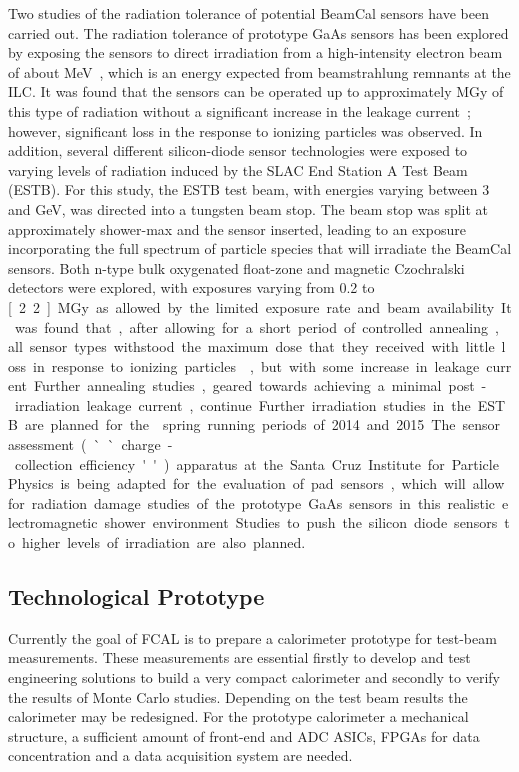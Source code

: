 Two studies of the radiation tolerance of potential BeamCal sensors have been carried out. The
radiation tolerance of prototype GaAs sensors has been explored by exposing the sensors
to direct irradiation from a high-intensity electron beam of about \unit[10]{MeV}~\cite{sdalinac},
which is an energy expected from beamstrahlung
remnants at the ILC.
It was found that the sensors can be operated up
to approximately \unit[1]{MGy} of this type of radiation without a significant increase in the
leakage current~\cite{1748-0221-7-11-P11022}; however, significant loss in the response to ionizing particles was observed.
In addition, several different silicon-diode sensor technologies were exposed to varying levels
of radiation induced by the SLAC End Station A Test Beam (ESTB).
For this study, the ESTB test beam, with energies
varying between 3 and \unit[11]{GeV}, was directed into a tungsten beam stop.
The beam stop was split at approximately shower-max and the sensor inserted,
leading to an exposure incorporating the full spectrum of particle species that will
irradiate the BeamCal sensors. Both n-type bulk oxygenated float-zone and magnetic Czochralski
detectors were explored, with exposures varying from 0.2 to \unit[2.2]{MGy} as allowed by
the limited exposure rate and
beam availability. It was found that, after allowing for a short period of controlled annealing,
all sensor types withstood the maximum dose that they received with little loss in response
to ionizing particles~\cite{2014arXiv1402.2692B}, but with some increase in leakage current. Further annealing studies,
geared towards achieving a minimal post-irradiation leakage current, continue.
Further irradiation studies in the ESTB are planned for the  spring running periods of 2014 and 2015.
The sensor assessment (``charge-collection efficiency'') apparatus at the Santa Cruz Institute
for Particle Physics is being adapted for the evaluation of pad sensors, which will allow for radiation
damage studies of the prototype GaAs sensors in this realistic electromagnetic shower environment.
Studies to push the silicon diode sensors to higher levels of irradiation are also planned.


\subsection{Technological Prototype}

Currently the goal of FCAL is to prepare a calorimeter prototype for test-beam measurements. These measurements
are essential firstly to develop and test engineering solutions to build a very compact calorimeter and
secondly to verify the results of Monte Carlo studies. Depending on the test beam
results the calorimeter may be redesigned.
For the prototype calorimeter
a mechanical structure, a sufficient amount of front-end and ADC ASICs, FPGAs for
data concentration and
a data acquisition system are needed.

